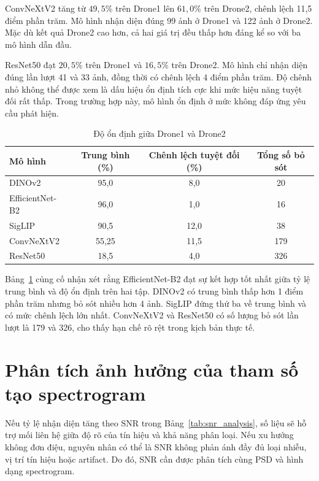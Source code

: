 \documentclass[../DoAn.tex]{subfiles}
\begin{document}
ConvNeXtV2 tăng từ $49,5\%$ trên Drone1 lên $61,0\%$ trên Drone2, chênh lệch 11,5 điểm phần trăm. Mô hình nhận diện đúng 99 ảnh ở Drone1 và 122 ảnh ở Drone2. Mặc dù kết quả Drone2 cao hơn, cả hai giá trị đều thấp hơn đáng kể so với ba mô hình dẫn đầu.

ResNet50 đạt $20,5\%$ trên Drone1 và $16,5\%$ trên Drone2. Mô hình chỉ nhận diện đúng lần lượt 41 và 33 ảnh, đồng thời có chênh lệch 4 điểm phần trăm. Độ chênh nhỏ không thể được xem là dấu hiệu ổn định tích cực khi mức hiệu năng tuyệt đối rất thấp. Trong trường hợp này, mô hình ổn định ở mức không đáp ứng yêu cầu phát hiện.

\begin{table}[H]
    \centering
    \caption{Độ ổn định giữa Drone1 và Drone2}
    \label{tab:real_stability}
    \renewcommand{\arraystretch}{1.3}
    \begin{tabular}{|p{}|c|c|c|}
        \hline
        \textbf{Mô hình} & \textbf{Trung bình (\%)} & \textbf{Chênh lệch tuyệt đối (\%)} & \textbf{Tổng số bỏ sót} \\ \hline
        DINOv2 & 95,0 & 8,0 & 20 \\ \hline
        EfficientNet-B2 & 96,0 & 1,0 & 16 \\ \hline
        SigLIP & 90,5 & 12,0 & 38 \\ \hline
        ConvNeXtV2 & 55,25 & 11,5 & 179 \\ \hline
        ResNet50 & 18,5 & 4,0 & 326 \\ \hline
    \end{tabular}
\end{table}

Bảng~\ref{tab:real_stability} củng cố nhận xét rằng EfficientNet-B2 đạt sự kết hợp tốt nhất giữa tỷ lệ trung bình và độ ổn định trên hai tập. DINOv2 có trung bình thấp hơn 1 điểm phần trăm nhưng bỏ sót nhiều hơn 4 ảnh. SigLIP đứng thứ ba về trung bình và có mức chênh lệch lớn nhất. ConvNeXtV2 và ResNet50 có số lượng bỏ sót lần lượt là 179 và 326, cho thấy hạn chế rõ rệt trong kịch bản thực tế.

\section{Phân tích ảnh hưởng của tham số tạo spectrogram}

Nếu tỷ lệ nhận diện tăng theo SNR trong Bảng~\ref{tab:snr_analysis}, số liệu sẽ hỗ trợ mối liên hệ giữa độ rõ của tín hiệu và khả năng phân loại. Nếu xu hướng không đơn điệu, nguyên nhân có thể là SNR không phản ánh đầy đủ loại nhiễu, vị trí tín hiệu hoặc artifact. Do đó, SNR cần được phân tích cùng PSD và hình dạng spectrogram.
\end{document}
